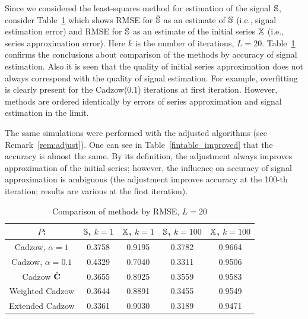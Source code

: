 \documentclass[sii]{ipart}
\begin{document}
\smallskip
Since we considered the least-squares method for estimation of the signal $\mathbb{S}$, consider Table~\ref{fintable} which shows RMSE for $\tilde {\mathbb{S}}$ as an estimate of $\mathbb{S}$ (i.e., signal estimation error) and RMSE for $\tilde {\mathbb{S}}$ as an estimate of the initial series $\mathbb{X}$ (i.e., series approximation error). Here $k$ is the number of iterations, $L=20$. Table~\ref{fintable} confirms the conclusions about comparison of the methods by accuracy of signal estimation. Also it is seen that the quality of initial series approximation does not always correspond with the quality of signal estimation. For example, overfitting is clearly present for the Cadzow($0.1$) iterations at first iteration. However, methods are ordered identically by errors of series approximation and signal estimation in the limit.

The same simulations were performed with the adjusted algorithms (see Remark~\ref{rem:adjust}). One can see in Table~\ref{fintable_improved} that the accuracy is almost the same. By its definition, the adjustment always improves approximation of the initial series; however, the influence on accuracy of signal approximation is ambiguous (the adjustment improves accuracy at the 100-th iteration; results are various at the first iteration).

\begin{table}
		\caption{Comparison of methods by RMSE, $L = 20$}\label{fintable}

		\begin{tabular*}{\textwidth}{@{\extracolsep{\fill}}ccccc}
			\hline
			$P$: & $\mathbb{S}$, $k = 1$ & $\mathbb{X}$, $k = 1$ & $\mathbb{S}$, $k = 100$ & $\mathbb{X}$, $k = 100$  \\
			\hline
			Cadzow, $\alpha = 1$ & 0.3758 & 0.9195 & 0.3782 & 0.9664 \\
			\hline
			Cadzow, $\alpha = 0.1$ & 0.4329 & 0.7040 & 0.3311 & 0.9506 \\
			\hline
			Cadzow $\hat{\mathbf{C}}$ & 0.3655 & 0.8925 & 0.3559 & 0.9583 \\
			\hline
			Weighted Cadzow & 0.3644 & 0.8891 & 0.3455 & 0.9549 \\
			\hline
			Extended Cadzow & 0.3361 & 0.9030 & 0.3189 & 0.9471 \\
			\hline
		\end{tabular*}
\end{table}
\end{document}
